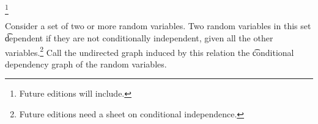 
\footnote{Future editions will include.}


Consider a set of two or more random variables.
Two random variables in this set \t{dependent} if they are not conditionally independent, given all the other variables.\footnote{Future editions need a sheet on conditional independence.}
Call the undirected graph induced by this relation the \t{conditional dependency graph} of the random variables.
